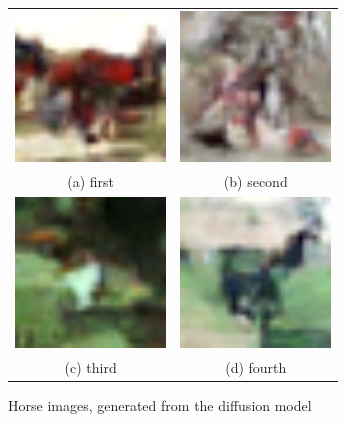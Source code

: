 \documentclass[conference]{IEEEtran}
\begin{document}
  \begin{figure}
    \begin{tabular}{cc}
      \includegraphics[width=40mm]{./images/generated-imgs/horse/0714.png} 
  &   \includegraphics[width=40mm]{./images/generated-imgs/horse/0715.png} 
  \\
    (a) first 
    & (b) second \\[6pt]
       \includegraphics[width=40mm]{./images/generated-imgs/horse/0716.png} 
    &  \includegraphics[width=40mm]{./images/generated-imgs/horse/0717.png} 
  \\
    (c) third & (d) fourth \\[6pt]
    \end{tabular}
    \caption{Horse images, generated from the diffusion model}
    \end{figure}
\end{document}
